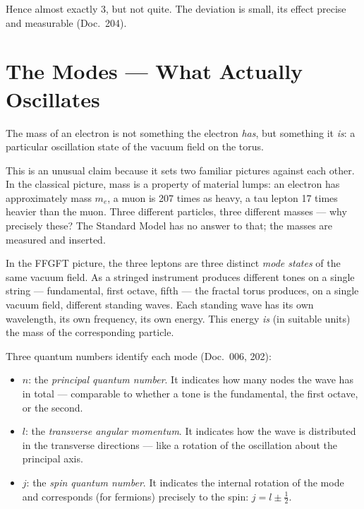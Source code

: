 \medskip\noindent
Hence almost exactly 3, but not quite. The deviation is small, its
effect precise and measurable (Doc.~204).

\section{The Modes --- What Actually Oscillates}

The mass of an electron is not something the electron \emph{has},
but something it \emph{is}: a particular oscillation state of the
vacuum field on the torus.

This is an unusual claim because it sets two familiar pictures
against each other. In the classical picture, mass is a property of
material lumps: an electron has approximately mass $m_e$, a muon is
207 times as heavy, a tau lepton 17 times heavier than the muon.
Three different particles, three different masses --- why precisely
these? The Standard Model has no answer to that; the masses are
measured and inserted.

In the FFGFT picture, the three leptons are three distinct
\emph{mode states} of the same vacuum field. As a stringed
instrument produces different tones on a single string ---
fundamental, first octave, fifth --- the fractal torus produces, on
a single vacuum field, different standing waves. Each standing wave
has its own wavelength, its own frequency, its own energy. This
energy \emph{is} (in suitable units) the mass of the corresponding
particle.

Three quantum numbers identify each mode (Doc.~006, 202):
\begin{itemize}
  \item $n$: the \emph{principal quantum number}. It indicates how
        many nodes the wave has in total --- comparable to whether a
        tone is the fundamental, the first octave, or the second.
  \item $l$: the \emph{transverse angular momentum}. It indicates
        how the wave is distributed in the transverse directions ---
        like a rotation of the oscillation about the principal axis.
  \item $j$: the \emph{spin quantum number}. It indicates the
        internal rotation of the mode and corresponds (for fermions)
        precisely to the spin: $j = l \pm \tfrac12$.
\end{itemize}

